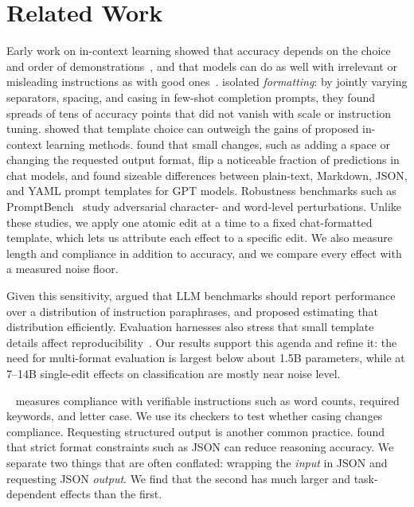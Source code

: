 \section{Related Work}
\label{sec:related}

 Early work on in-context learning showed that accuracy depends on the choice and order of demonstrations~\cite{zhao2021calibrate,lu2022fantastically}, and that models can do as well with irrelevant or misleading instructions as with good ones~\cite{webson2022prompt}. \citet{sclar2024quantifying} isolated \emph{formatting}: by jointly varying separators, spacing, and casing in few-shot completion prompts, they found spreads of tens of accuracy points that did not vanish with scale or instruction tuning. \citet{voronov2024mind} showed that template choice can outweigh the gains of proposed in-context learning methods. \citet{salinas2024butterfly} found that small changes, such as adding a space or changing the requested output format, flip a noticeable fraction of predictions in chat models, and \citet{he2024does} found sizeable differences between plain-text, Markdown, JSON, and YAML prompt templates for GPT models. Robustness benchmarks such as PromptBench~\cite{zhu2023promptbench} study adversarial character- and word-level perturbations. Unlike these studies, we apply one atomic edit at a time to a fixed chat-formatted template, which lets us attribute each effect to a specific edit. We also measure length and compliance in addition to accuracy, and we compare every effect with a measured noise floor.

 Given this sensitivity, \citet{mizrahi2024state} argued that LLM benchmarks should report performance over a distribution of instruction paraphrases, and \citet{polo2024efficient} proposed estimating that distribution efficiently. Evaluation harnesses also stress that small template details affect reproducibility~\cite{biderman2024lessons}. Our results support this agenda and refine it: the need for multi-format evaluation is largest below about 1.5B parameters, while at 7--14B single-edit effects on classification are mostly near noise level.

 \ifeval~\cite{zhou2023instruction} measures compliance with verifiable instructions such as word counts, required keywords, and letter case. We use its checkers to test whether casing changes compliance. Requesting structured output is another common practice. \citet{tam2024let} found that strict format constraints such as JSON can reduce reasoning accuracy. We separate two things that are often conflated: wrapping the \emph{input} in JSON and requesting JSON \emph{output}. We find that the second has much larger and task-dependent effects than the first.

